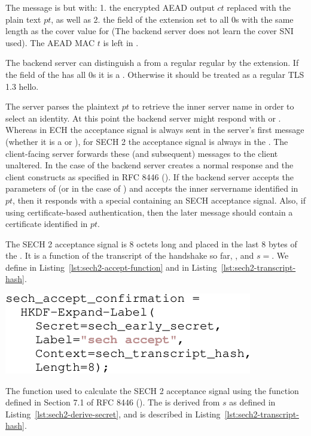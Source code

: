 The  message  is  but with: 1. the encrypted AEAD output $ct$ replaced with the plain text $pt$, as well as 2. the  field of the  extension set to all 0s with the same length as the cover value for  (The backend server does not learn the cover SNI used). The AEAD MAC $t$ is left in .

The backend server can distinguish a  from a regular regular  by the  extension. If the  field of the  has all 0s it is a . Otherwise it should be treated as a regular TLS 1.3 hello.

The server parses the plaintext $pt$ to retrieve the inner server name in order to select an identity. At this point the backend server might respond with  or . Whereas in ECH the acceptance signal is always sent in the server's first message (whether it is a  or ), for SECH 2 the acceptance signal is always in the . The client-facing server forwards these (and subsequent) messages to the client unaltered. In the case of  the backend server creates a normal  response and the client constructs  as specified in RFC 8446 (\cite{rfc8446}). If the backend server accepts the parameters of  (or  in the case of ) and accepts the inner servername identified in $pt$, then it responds with a special  containing an SECH acceptance signal. Also, if using certificate-based authentication, then the later  message should contain a certificate identified in $pt$.

The SECH 2 acceptance signal is 8 octets long and placed in the last 8 bytes of the . It is a function of the transcript of the handshake so far, , and $s=$. We define  in Listing~\ref{lst:sech2-accept-function} and  in Listing~\ref{lst:sech2-transcript-hash}.

\begin{listing}[htb]
\centering
\includegraphics[width=.7\linewidth]{figure/sech2-accept-function.pdf}
\captionsetup{width=.8\linewidth} 
\caption[SECH 2 Accept Confirmation]{The function used to calculate the SECH 2 acceptance signal using the  function defined in Section 7.1 of RFC 8446 (\cite{rfc8446}). The  is derived from $s$ as defined in Listing~\ref{lst:sech2-derive-secret}, and  is described in Listing~\ref{lst:sech2-transcript-hash}.}
\label{lst:sech2-accept-function}
\end{listing}

